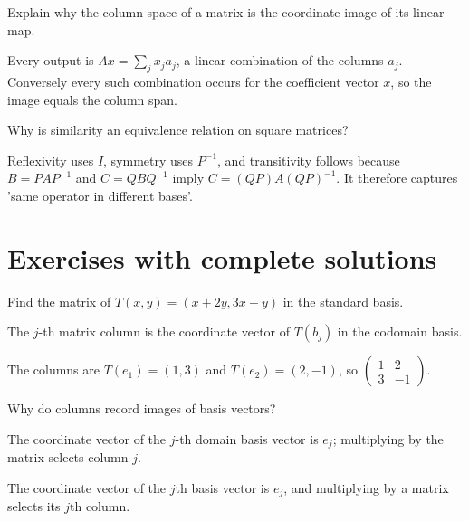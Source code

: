 \begin{problem}\label{prob:i07-problem-11}
Explain why the column space of a matrix is the coordinate image of its linear map.
\end{problem}
\begin{solution}
Every output is $Ax=\sum_jx_j a_j$, a linear combination of the columns $a_j$. Conversely every such combination occurs for the coefficient vector $x$, so the image equals the column span.
\end{solution}

\begin{problem}\label{prob:i07-problem-12}
Why is similarity an equivalence relation on square matrices?
\end{problem}
\begin{solution}
Reflexivity uses $I$, symmetry uses $P^{-1}$, and transitivity follows because $B=PAP^{-1}$ and $C=QBQ^{-1}$ imply $C=(QP)A(QP)^{-1}$. It therefore captures 'same operator in different bases'.
\end{solution}


\section{Exercises with complete solutions}

\begin{exercise}\label{exr:i07-01}
Find the matrix of $T(x,y)=(x+2y,3x-y)$ in the standard basis.
\end{exercise}
\begin{hint}
The \(j\)-th matrix column is the coordinate vector of \(T(b_j)\) in the codomain basis.
\end{hint}
\begin{solution}
The columns are $T(e_1)=(1,3)$ and $T(e_2)=(2,-1)$, so $\begin{pmatrix}1&2\\3&-1\end{pmatrix}$.
\end{solution}

\begin{exercise}\label{exr:i07-02}
Why do columns record images of basis vectors?
\end{exercise}
\begin{hint}
The coordinate vector of the \(j\)-th domain basis vector is \(e_j\); multiplying by the matrix selects column \(j\).
\end{hint}
\begin{solution}
The coordinate vector of the $j$th basis vector is $e_j$, and multiplying by a matrix selects its $j$th column.
\end{solution}

